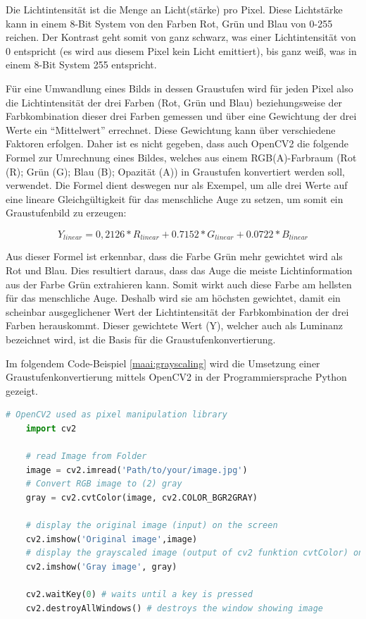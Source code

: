 Die Lichtintensität ist die Menge an Licht(stärke) pro Pixel. Diese Lichtstärke kann in einem 8-Bit System von den Farben Rot, Grün und Blau von 0-255 reichen. Der Kontrast geht somit von ganz schwarz, was einer Lichtintensität von 0 entspricht (es wird aus diesem Pixel kein Licht emittiert), bis ganz weiß, was in einem 8-Bit System 255 entspricht.

Für eine Umwandlung eines Bilds in dessen Graustufen wird für jeden Pixel also die Lichtintensität der drei Farben (Rot, Grün und Blau) beziehungsweise der Farbkombination dieser drei Farben gemessen und über eine Gewichtung der drei Werte ein ``Mittelwert'' errechnet. Diese Gewichtung kann über verschiedene Faktoren erfolgen. Daher ist es nicht gegeben, dass auch OpenCV2 die folgende Formel zur Umrechnung eines Bildes, welches aus einem RGB(A)-Farbraum (Rot (R); Grün (G); Blau (B); Opazität (A)) in Graustufen konvertiert werden soll, verwendet. Die Formel dient deswegen nur als Exempel, um alle drei Werte auf eine lineare Gleichgültigkeit für das menschliche Auge zu setzen, um somit ein Graustufenbild zu erzeugen:

\[
  Y_{ linear } = 0,2126 * R_{ linear } + 0.7152 * G_{ linear } + 0.0722 * B_{ linear }
\]

Aus dieser Formel ist erkennbar, dass die Farbe Grün mehr gewichtet wird als Rot und Blau. Dies resultiert daraus, dass das Auge die meiste Lichtinformation aus der Farbe Grün extrahieren kann. Somit wirkt auch diese Farbe am hellsten für das menschliche Auge. Deshalb wird sie am höchsten gewichtet, damit ein scheinbar ausgeglichener Wert der Lichtintensität der Farbkombination der drei Farben herauskommt. Dieser gewichtete Wert (Y), welcher auch als Luminanz bezeichnet wird, ist die Basis für die Graustufenkonvertierung.

Im folgendem Code-Beispiel \ref{maai:grayscaling} wird die Umsetzung einer Graustufenkonvertierung mittels OpenCV2 in der Programmiersprache Python gezeigt.

\begin{lstlisting}[caption=Graustufenkonvertierung,language=Python,label=maai:grayscaling]
    # OpenCV2 used as pixel manipulation library
    import cv2
  
    # read Image from Folder
    image = cv2.imread('Path/to/your/image.jpg')
    # Convert RGB image to (2) gray
    gray = cv2.cvtColor(image, cv2.COLOR_BGR2GRAY)
    
    # display the original image (input) on the screen
    cv2.imshow('Original image',image)
    # display the grayscaled image (output of cv2 funktion cvtColor) on the screen
    cv2.imshow('Gray image', gray)
      
    cv2.waitKey(0) # waits until a key is pressed
    cv2.destroyAllWindows() # destroys the window showing image
\end{lstlisting}

